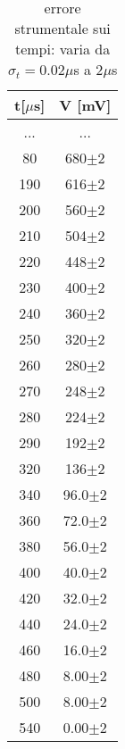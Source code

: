 \documentclass[a4paper]{article}
\theoremstyle{definition}
\begin{document}
\begin{table}[!htbp]
{\begin{minipage}{.5\linewidth}
    	 \caption{ }
            \begin{tabular}{c|c}

        t[\(\mu\)s] & V [mV] \\
        \hline
        \hline
        
       ... & ...\\
       \hline
       80& 680\(\pm 2\)\\
       \hline
       190& 616\(\pm 2\)\\
       \hline
       200& 560\(\pm 2\)\\
       \hline
       210& 504\(\pm 2\)\\
       \hline
       220& 448\(\pm 2\)\\
       \hline
       230& 400\(\pm 2\)\\
       \hline
       240& 360\(\pm 2\)\\
       \hline
       250& 320\(\pm 2\)\\
       \hline
       260& 280\(\pm 2\)\\
       \hline
       270& 248\(\pm 2\)\\
       \hline
       280& 224\(\pm 2\)\\
       \hline
       290& 192\(\pm 2\)\\
       \hline
       320& 136\(\pm 2\)\\
       \hline
       340& 96.0\(\pm 2\)\\
       \hline
       360& 72.0\(\pm 2\)\\
       \hline
       380& 56.0\(\pm 2\)\\
       \hline
       400& 40.0\(\pm 2\)\\
       \hline
       420& 32.0\(\pm 2\)\\
       \hline
       440& 24.0\(\pm 2\)\\
       \hline
       460& 16.0\(\pm 2\)\\
       \hline
       480& 8.00\(\pm 2\)\\
       \hline
       500& 8.00\(\pm 2\)\\
       \hline
       540& 0.00\(\pm 2\)\\
        \hline
        \hline
    \end{tabular}
    \end{minipage} 
        }
        \caption{errore strumentale sui tempi: varia da \(\sigma_{t} = 0.02\mu\)s a \(2 \mu\)s}
        \label{tab_carica_RC}

\end{table}
\end{document}
